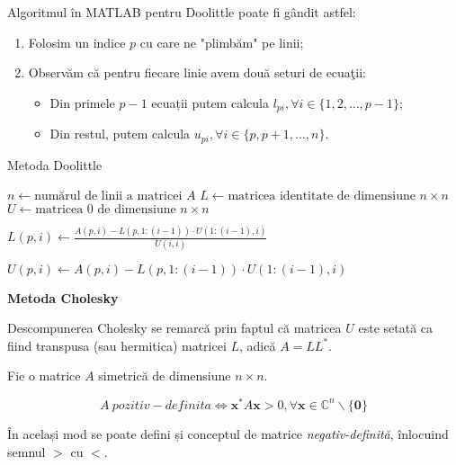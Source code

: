 \documentclass{exam}
\newcommand{\octavescript}[2]{
	
}
\begin{document}
Algoritmul în MATLAB pentru Doolittle poate fi gândit astfel:
\begin{enumerate}
	\item Folosim un indice $p$ cu care ne "plimbăm" pe linii;
	\item Observăm că pentru fiecare linie avem două seturi de ecuaţii:
	      \begin{itemize}
		      \item Din primele $p - 1$ ecuații putem calcula $l_{pi}, \forall i \in \{1, 2, \ldots, p - 1\}$;
		      \item Din restul, putem calcula $u_{pi}, \forall i \in \{p, p + 1, \ldots, n\}$.
	      \end{itemize}
\end{enumerate}

\newpage

\begin{algorithm}
	\caption{Metoda Doolittle}
	\begin{algorithmic}[1]
		\State \( n \gets \text{numărul de linii a matricei } A \)
		\State \( L \gets \text{matricea identitate de dimensiune } n \times n \)
		\State \( U \gets \text{matricea 0 de dimensiune } n \times n \)

		\State \( L(p, i) \gets \frac{A(p, i) - L(p, 1:(i-1)) \cdot U(1:(i-1), i)}{U(i, i)} \)
		\EndFor

		\State \( U(p, i) \gets A(p, i) - L(p, 1:(i-1)) \cdot U(1:(i-1), i) \)
		\EndFor
		\EndFor
	\end{algorithmic}
\end{algorithm}

\textbf{Metoda Cholesky}

\par Descompunerea Cholesky se remarcă prin faptul că matricea $U$ este setată
ca fiind transpusa (sau hermitica) matricei $L$, adică $A = LL^*$.

\par Fie o matrice $A$ simetrică de dimensiune $n \times n$.

\begin{equation*}
	A \ pozitiv-definita \Leftrightarrow \mathbf{x}^* A \mathbf{x} > 0, \forall \mathbf{x} \in \mathbb{C}^n \backslash \{\mathbf{0}\}
\end{equation*}

\par În același mod se poate defini și conceptul de matrice
\textit{negativ-definită}, înlocuind semnul $>$ cu $<$.
\end{document}
